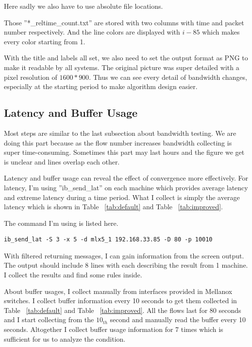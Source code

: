 \documentclass[12pt,a4paper]{article}
\begin{document}
Here sadly we also have to use absolute file locations.

Those ''*\_reltime\_count.txt'' are stored with two columns with time and packet number respectively.
And the line colors are displayed with $i-85$ which makes every color starting from 1.

With the title and labels all set, we also need to set the output format as PNG to make it readable by all systems.
The original picture was super detailed with a pixel resolution of $1600*900$.
Thus we can see every detail of bandwidth changes, especially at the starting period to make algorithm design easier.

\subsection{Latency and Buffer Usage}

Most steps are similar to the last subsection about bandwidth testing.
We are doing this part because as the flow number increases bandwidth collecting is super time-consuming.
Sometimes this part may last hours and the figure we get is unclear and lines overlap each other.

Latency and buffer usage can reveal the effect of convergence more effectively.
For latency, I'm using ''ib\_send\_lat'' on each machine which provides average latency and extreme latency during a time period.
What I collect is simply the average latency which is shown in Table ~\ref{tab:default} and Table ~\ref{tab:improved}.

The command I'm using is listed here.
\begin{lstlisting}
ib_send_lat -S 3 -x 5 -d mlx5_1 192.168.33.85 -D 80 -p 10010
\end{lstlisting}

With filtered returning messages, I can gain information from the screen output.
The output should include 8 lines with each describing the result from 1 machine.
I collect the results and find some rules inside.

About buffer usages, I collect manually from interfaces provided in Mellanox switches.
I collect buffer information every 10 seconds to get them collected in Table ~\ref{tab:default} and Table ~\ref{tab:improved}.
All the flows last for 80 seconds and I start collecting from the $10_{th}$ second and manually read the buffer every 10 seconds.
Altogether I collect buffer usage information for 7 times which is sufficient for us to analyze the condition.
\end{document}
